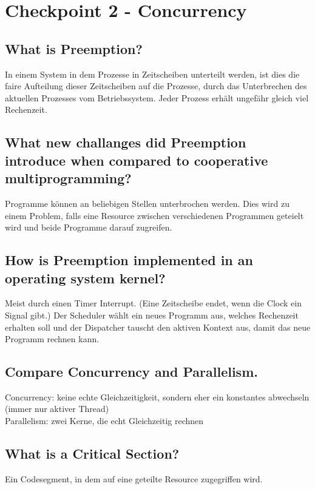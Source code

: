 \section{Checkpoint 2 - Concurrency}

\addtocounter{subsection}{1}

\subsection{\important What is Preemption?}
In einem System in dem Prozesse in Zeitscheiben unterteilt werden, ist dies die faire Aufteilung dieser Zeitscheiben auf die Prozesse, durch das Unterbrechen des aktuellen Prozesses vom Betriebssystem.
Jeder Prozess erhält ungefähr gleich viel Rechenzeit.

\subsection{What new challanges did Preemption introduce when compared to cooperative multiprogramming?}
Programme können an beliebigen Stellen unterbrochen werden.
Dies wird zu einem Problem, falls eine Resource zwischen verschiedenen Programmen geteielt wird und beide Programme darauf zugreifen.

\subsection{How is Preemption implemented in an operating system kernel?}
Meist durch einen Timer Interrupt. (Eine Zeitscheibe endet, wenn die Clock ein Signal gibt.)
Der Scheduler wählt ein neues Programm aus, welches Rechenzeit erhalten soll und der Dispatcher tauscht den aktiven Kontext aus, damit das neue Programm rechnen kann.

\subsection{\important Compare Concurrency and Parallelism.}
Concurrency: keine echte Gleichzeitigkeit, sondern eher ein konstantes abwechseln (immer nur aktiver Thread)\\
Parallelism: zwei Kerne, die echt Gleichzeitig rechnen

\subsection{\important What is a Critical Section?}
Ein Codesegment, in dem auf eine geteilte Resource zugegriffen wird.

